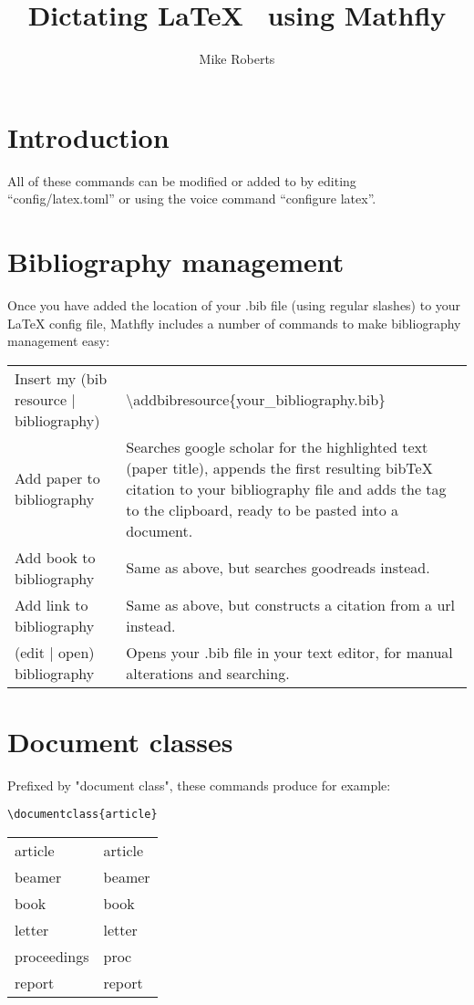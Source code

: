 \documentclass[12pt, a4paper]{article}
\title{Dictating \LaTeX~ using Mathfly}
\author{Mike Roberts}
\begin{document}
\maketitle
\tableofcontents

\section{Introduction}
All of these commands can be modified or added to by editing ``config/latex.toml'' or using the voice command ``configure latex''.

\section{Bibliography management}
Once you have added the location of your .bib file (using regular slashes) to your LaTeX config file, Mathfly includes a number of commands to make bibliography management easy:

\begin{tabularx}{\linewidth}{ l X}
Insert my (bib resource | bibliography) & \textbackslash addbibresource\{your\_bibliography.bib\} \\
Add paper to bibliography & Searches google scholar for the highlighted text (paper title), appends the first resulting bibTeX citation to your bibliography file and adds the tag to the clipboard, ready to be pasted into a document. \\
Add book to bibliography & Same as above, but searches goodreads instead. \\
Add link to bibliography & Same as above, but constructs a citation from a url instead. \\
(edit | open) bibliography & Opens your .bib file in your text editor, for manual alterations and searching. \\
\end{tabularx}

\section{Document classes}
Prefixed by "document class", these commands produce for example:

\begin{verbatim}
\documentclass{article}
\end{verbatim}

\begin{longtable}{ll}
\centering
article & article \\
beamer & beamer \\
book & book \\
letter & letter \\
proceedings & proc \\
report & report \\
\end{longtable}
\end{document}

